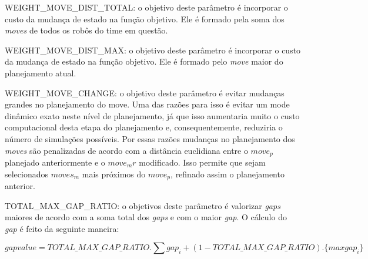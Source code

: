 WEIGHT{\_}MOVE{\_}DIST{\_}TOTAL: o objetivo deste parâmetro é incorporar o custo da
mudança de estado na função objetivo. Ele é formado pela soma dos \textit{
moves} de todos os robôs do time em questão.

WEIGHT{\_}MOVE{\_}DIST{\_}MAX: o objetivo deste parâmetro é incorporar o custo da
mudança de estado na função objetivo. Ele é formado pelo \textit{move}
maior do planejamento atual.

WEIGHT{\_}MOVE{\_}CHANGE: o objetivo deste parâmetro é evitar mudanças grandes no
planejamento do move. Uma das razões para isso é evitar um mode dinâmico
exato neste nível de planejamento, já que isso aumentaria muito o custo
computacional desta etapa do planejamento e, consequentemente, reduziria
o número de simulações possíveis. Por essas razões mudanças no planejamento
dos \textit{moves} são penalizadas de acordo com a distância euclidiana
entre o $move_p$ planejado anteriormente e o $move_mr$ modificado.
Isso permite que sejam selecionados $moves_m$ mais próximos do
$move_p$, refinado assim o planejamento anterior.


TOTAL{\_}MAX{\_}GAP{\_}RATIO: o objetivos deste parâmetro é valorizar \textit{gaps} maiores
de acordo com a soma total dos \textit{gaps} e com o maior \textit{gap}.
O cálculo do \textit{gap} é feito da seguinte maneira:

\begin{dmath} 
 gap value = TOTAL\_MAX\_GAP\_RATIO . \sum gap_i + (1 - TOTAL\_MAX\_GAP\_RATIO) .
 \lbrace maxgap_i \rbrace
\end{dmath} 

%
